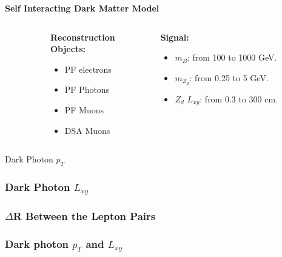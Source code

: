 \documentclass{beamer}
\begin{document}
\begin{frame}[t]{\textbf{Self Interacting Dark Matter Model}}
\begin{columns}
\begin{column}{.4\textwidth}
    \end{column}
    
    \begin{column}{.3\textwidth}
    \centering
    \textbf{\textcolor{peacockblue}{Reconstruction \\
    Objects:}}
    \begin{itemize}
        \item PF electrons
         \item PF Photons
         \item PF Muons
         \item DSA Muons
    \end{itemize}
        
    \end{column}
    \begin{column}{.3\textwidth}
    \centering
    \textbf{\textcolor{peacockblue}{Signal:}}
    \begin{itemize}
        \item   $m_B$: from 100 to 1000 GeV.
         \item $m_{Z_d}$: from 0.25 to 5 GeV.
         \item $Z_d$ $L_{xy}$: from 0.3 to 300 cm.
    \end{itemize}
    \end{column}
    \end{columns}
    \end{frame}
    \begin{frame}{Dark Photon $p_T$}
        
    \end{frame}
    \begin{frame}
        \frametitle{Dark Photon $L_{xy}$}
    \end{frame}
    \begin{frame}
        \frametitle{$\Delta$R Between the Lepton Pairs}
    \end{frame}
    \begin{frame}
        \frametitle{Dark photon $p_T$ and $L_{xy}$}
    \end{frame}
\end{document}
